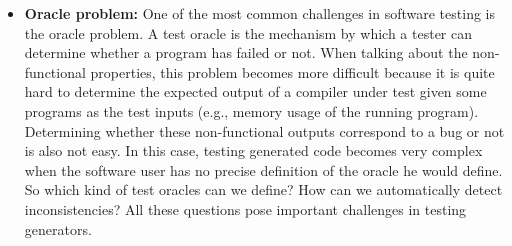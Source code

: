\begin{itemize}
\item
\textbf{Oracle problem:} One of the most common challenges in software testing is the oracle problem. A test oracle is the mechanism by which a tester can determine whether a program has failed or not.
When talking about the non-functional properties, this problem becomes more difficult because it is quite hard to determine the expected output of a compiler under test given some programs as the test inputs (e.g., memory usage of the running program). Determining  whether these non-functional outputs correspond to a bug or not is also not easy. In this case, testing generated code becomes very complex when the software user has no precise definition of the oracle he would define. So which kind of test oracles can we define? How can we automatically detect inconsistencies? All these questions pose important challenges in testing generators.



\end{itemize}
